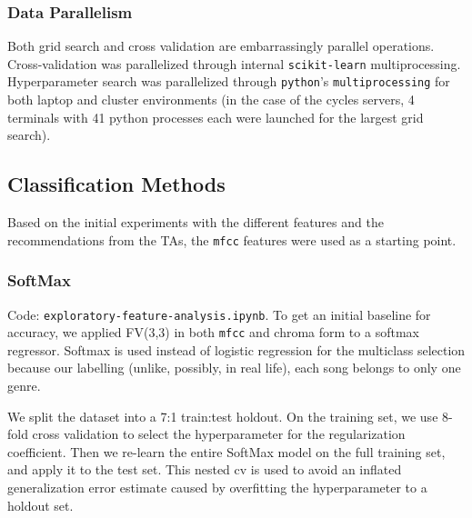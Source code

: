 \documentclass{article}
\begin{document}
\subsubsection{Data Parallelism}

Both grid search and cross validation are embarrassingly parallel operations. Cross-validation was parallelized through internal \texttt{scikit-learn} multiprocessing. Hyperparameter search was parallelized through \texttt{python}'s \texttt{multiprocessing} for both laptop and cluster environments (in the case of the cycles servers, 4 terminals with 41 python processes each were launched for the largest grid search).

\subsection{Classification Methods}

Based on the initial experiments with the different features and the recommendations from the TAs, the \texttt{mfcc} features were used as a starting point.

\subsubsection{SoftMax}

Code: \texttt{exploratory-feature-analysis.ipynb}. To get an initial baseline for accuracy, we applied FV(3,3) in both \texttt{mfcc} and chroma form to a softmax regressor. Softmax is used instead of logistic regression for the multiclass selection because our labelling (unlike, possibly, in real life), each song belongs to only one genre.

We split the dataset into a 7:1 train:test holdout. On the training set, we use 8-fold cross validation to select the hyperparameter for the regularization coefficient. Then we re-learn the entire SoftMax model on the full training set, and apply it to the test set. This nested cv is used to avoid an inflated generalization error estimate caused by overfitting the hyperparameter to a holdout set.
\end{document}
